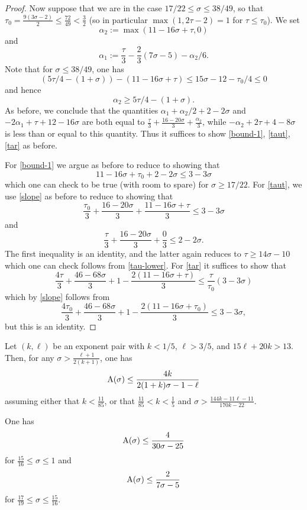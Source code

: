 \begin{proof}
Now suppose that we are in the case $17/22 \leq \sigma \leq 38/49$, so that $\tau_0 = \frac{9(3\sigma-2)}{2} \leq \frac{72}{49} < \frac{3}{2}$ (so in particular $\max(1,2\tau-2) = 1$ for $\tau \leq \tau_0$).  We set
$$ \alpha_2 := \max(11 - 16 \sigma + \tau,0)$$
and
$$ \alpha_1 := \frac{\tau}{3} - \frac{2}{3} (7\sigma-5) - \alpha_2/6.$$
Note that for $\sigma \leq 38/49$, one has
$$ (5\tau/4 - (1+\sigma)) - (11 - 16 \sigma + \tau) \leq 15\sigma - 12 - \tau_0/4 \leq 0$$
and hence
$$ \alpha_2 \geq 5\tau/4 - (1+\sigma).$$
As before, we conclude that the quantities $\alpha_1+\alpha_2/2 + 2-2\sigma$ and $-2\alpha_1 + \tau + 12 - 16 \sigma$ are both equal to $\frac{\tau}{3} + \frac{16-20\sigma}{3} + \frac{\alpha_2}{3}$, while $-\alpha_2 + 2\tau+4-8\sigma$ is less than or equal to this quantity.  Thus it suffices to show \eqref{bound-1}, \eqref{taut}, \eqref{tar} as before.

For \eqref{bound-1} we argue as before to reduce to showing that
$$ 11 - 16 \sigma + \tau_0 + 2 - 2 \sigma \leq 3 - 3\sigma$$
which one can check to be true (with room to spare) for $\sigma \geq 17/22$.  For \eqref{taut}, we use \eqref{slope} as before to reduce to showing that
$$ \frac{\tau_0}{3} + \frac{16-20\sigma}{3} + \frac{11 - 16 \sigma + \tau}{3} \leq 3 -3 \sigma$$
and
$$ \frac{\tau}{3} + \frac{16-20\sigma}{3} + \frac{0}{3} \leq 2 -2 \sigma.$$
The first inequality is an identity, and the latter again reduces to  $\tau \geq 14\sigma-10$ which one can check follows from \eqref{tau-lower}.  For \eqref{tar} it suffices to show that
$$ \frac{4\tau}{3} + \frac{46-68\sigma}{3}  + 1 - \frac{2(11 - 16 \sigma + \tau)}{3} \leq \frac{\tau}{\tau_0} (3-3\sigma)$$
which by \eqref{slope} follows from
$$ \frac{4\tau_0}{3} + \frac{46-68\sigma}{3}  + 1 - \frac{2(11 - 16 \sigma + \tau_0)}{3} \leq 3 - 3\sigma,$$
but this is an identity.
\end{proof}

\begin{theorem}\label{bourgain-zd}\cite[Proposition 3]{bourgain_remarks_1995}  Let $(k,\ell)$ be an exponent pair with $k < 1/5$, $\ell > 3/5$, and $15\ell + 20k > 13$.  Then, for any $\sigma > \frac{\ell+1}{2(k+1)}$, one has
    $$ \mathrm{A}(\sigma) \leq \frac{4k}{2(1+k)\sigma - 1 - \ell}$$
    assuming either that $k < \frac{11}{85}$, or that $\frac{11}{85} < k < \frac{1}{5}$ and $\sigma > \frac{144k-11\ell-11}{170k-22}$.
\end{theorem}

\begin{corollary}\label{bourgain-zero-density}\cite[Corollary 4]{bourgain_remarks_1995}  One has
    $$ \mathrm{A}(\sigma) \leq \frac{4}{30\sigma-25}$$
    for $\frac{15}{16} \leq \sigma \leq 1$
    and
    $$ \mathrm{A}(\sigma) \leq \frac{2}{7\sigma-5}$$
    for $\frac{17}{19} \leq \sigma \leq \frac{15}{16}$.
\end{corollary}

